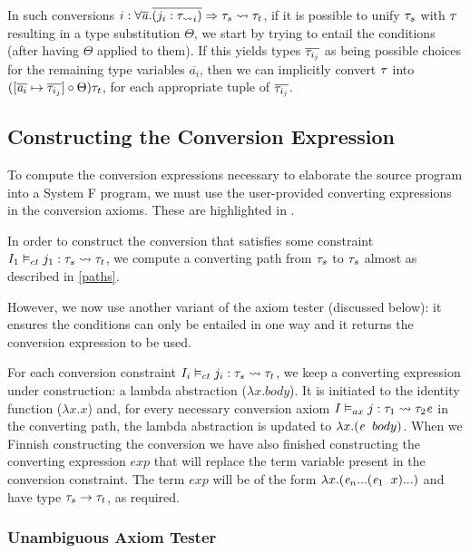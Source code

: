  In such conversions $i : \forall \overline {\mathit{a}} . \overline{(j_i : \mathit{\tau_{\rightsquigarrow}}_i)} \Rightarrow \mathit{\tau}_s \rightsquigarrow \mathit{\tau}_t$, if it is possible to unify $\mathit{\tau}_s$ with $\mathit{\tau}$ resulting in a type substitution $\Theta$, we start by trying to entail the conditions (after having $\Theta$ applied to them). If this yields types $\overline{\mathit{\tau}_{i_j}}$ as being possible choices for the remaining type variables $\overline{a_i}$, then we can implicitly convert $\mathit{\tau}$ into  $([\overline{\mathit{a}_i} \mapsto \overline{\mathit{\tau}_{i_j}}]\circ \Theta)\mathit{\tau}_t$, for each appropriate tuple of $\overline{\mathit{\tau}_{i_j}}$.



\subsection{Constructing the Conversion Expression}
\label{constr}
To compute the conversion expressions necessary to elaborate the source program into a System F program, we must use the user-provided converting expressions in the conversion axioms. These are highlighted in .

In order to construct the conversion that satisfies some constraint ${I_1} \vDash_{ct} {j_1}: {\mathit{\tau}_s} \rightsquigarrow {\mathit{\tau}_t}$, we compute a converting path from $\mathit{\tau}_s$ to $\mathit{\tau}_s$ almost as described in \ref{paths}.

However, we now use another variant of the axiom tester (discussed below): it ensures the conditions can only be entailed in one way and it returns the conversion expression to be used.

For each conversion constraint ${I_i} \vDash_{ct} {j_i}: {\mathit{\tau}_{s}} \rightsquigarrow {\mathit{\tau}_{t}}$, we keep a converting expression under construction: a lambda abstraction ($\lambda x . body$). It is initiated to the identity function ($\lambda x. x$) and, for every necessary conversion axiom ${I} \vDash_{ax} {j}: {\mathit{\tau}_1} \rightsquigarrow {\mathit{\tau}_2}{\mathit{e}}$ in the converting path, the lambda abstraction is updated to $\lambda x . (\mathit{e} \;\;body)$. When we Finnish constructing the conversion we have also finished constructing the converting expression $exp$ that will replace the term variable present in the conversion constraint. The term $exp$ will be of the form $\lambda x . (\mathit{e}_n ... (\mathit{e}_1\;\;x)...)$ and have type $\mathit{\tau}_s \to \mathit{\tau}_t$, as required.

\subsubsection{Unambiguous Axiom Tester}

